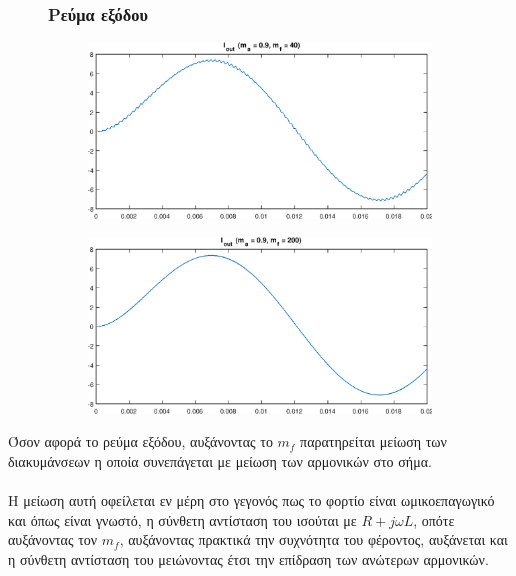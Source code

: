 \begin{figure}[h!]
	\subsubsection*{Ρεύμα εξόδου}
	\begin{subfigure}{0.49\textwidth}
		\centering
		\includegraphics[width=1\textwidth]{Images/I_out_40}
	\end{subfigure}
	\begin{subfigure}{0.49\textwidth}
		\centering
		\includegraphics[width=1\textwidth]{Images/I_out_200}
	\end{subfigure}
\end{figure}
\noindent
Όσον αφορά το ρεύμα εξόδου, αυξάνοντας το $m_f$ παρατηρείται μείωση των διακυμάνσεων η οποία συνεπάγεται με μείωση των αρμονικών στο σήμα.\\\\
Η μείωση αυτή οφείλεται εν μέρη στο γεγονός πως το φορτίο είναι ωμικοεπαγωγικό και όπως είναι γνωστό, η σύνθετη αντίσταση του ισούται με $R + j\omega L$, οπότε αυξάνοντας τον $m_f$, αυξάνοντας πρακτικά την συχνότητα του φέροντος, αυξάνεται και η σύνθετη αντίσταση του μειώνοντας  έτσι την επίδραση των ανώτερων αρμονικών.


